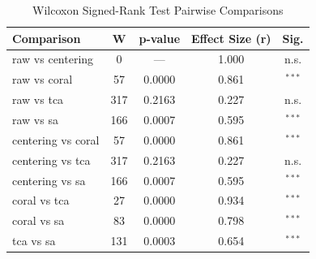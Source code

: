 \begin{table}[htbp]
\centering
\caption{Wilcoxon Signed-Rank Test Pairwise Comparisons}
\label{tab:wilcoxon}
\begin{tabular}{lcccc}
\toprule
Comparison & W & p-value & Effect Size (r) & Sig. \\
\midrule
raw vs centering & 0 & — & 1.000 & n.s. \\
raw vs coral & 57 & 0.0000 & 0.861 & $^{***}$ \\
raw vs tca & 317 & 0.2163 & 0.227 & n.s. \\
raw vs sa & 166 & 0.0007 & 0.595 & $^{***}$ \\
centering vs coral & 57 & 0.0000 & 0.861 & $^{***}$ \\
centering vs tca & 317 & 0.2163 & 0.227 & n.s. \\
centering vs sa & 166 & 0.0007 & 0.595 & $^{***}$ \\
coral vs tca & 27 & 0.0000 & 0.934 & $^{***}$ \\
coral vs sa & 83 & 0.0000 & 0.798 & $^{***}$ \\
tca vs sa & 131 & 0.0003 & 0.654 & $^{***}$ \\
\bottomrule
\end{tabular}
\end{table}